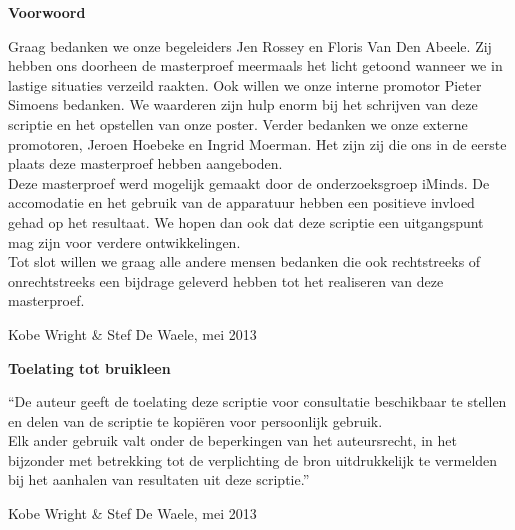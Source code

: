 
\newpage

\noindent \textbf{\huge Voorwoord}

\vspace{1.5cm}

\noindent
Graag bedanken we onze begeleiders Jen Rossey en Floris Van Den Abeele. Zij hebben ons doorheen de masterproef meermaals het licht getoond wanneer we in lastige situaties verzeild raakten. Ook willen we onze interne promotor Pieter Simoens bedanken. We waarderen zijn hulp enorm bij het schrijven van deze scriptie en het opstellen van onze poster. Verder bedanken we onze externe promotoren, Jeroen Hoebeke en Ingrid Moerman. Het zijn zij die ons in de eerste plaats deze masterproef hebben aangeboden. \\
Deze masterproef werd mogelijk gemaakt door de onderzoeksgroep iMinds. De accomodatie en het gebruik van de apparatuur hebben een positieve invloed gehad op het resultaat. We hopen dan ook dat deze scriptie een uitgangspunt mag zijn voor verdere ontwikkelingen.\\
Tot slot willen we graag alle andere mensen bedanken die ook rechtstreeks of onrechtstreeks een bijdrage geleverd hebben tot het realiseren van deze masterproef.

\addvspace{4cm}

\noindent Kobe Wright \& Stef De Waele, mei 2013\newpage

\noindent \textbf{\huge Toelating tot bruikleen}

\vspace{1.5cm}

\noindent
``De auteur geeft de toelating deze scriptie voor consultatie beschikbaar
te stellen en delen van de scriptie te kopi\"eren voor persoonlijk
gebruik.\\
Elk ander gebruik valt onder de beperkingen van het auteursrecht,
in het bijzonder met betrekking tot de verplichting de bron uitdrukkelijk
te vermelden bij het aanhalen van resultaten uit deze scriptie.''

\addvspace{4cm}

\noindent Kobe Wright \& Stef De Waele, mei 2013
